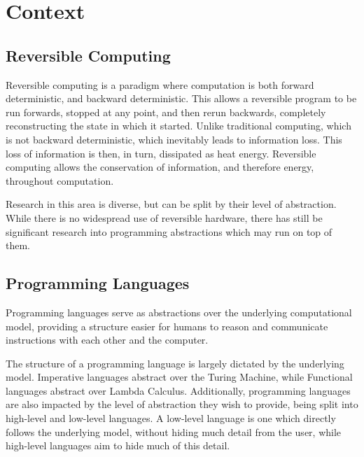 \chapter{Context}


\section{Reversible Computing}


Reversible computing is a paradigm where computation is both forward deterministic, and backward deterministic\cite{IntroductionToReversibleComputing}. This allows a reversible program to be run forwards, stopped at any point, and then rerun backwards, completely reconstructing the state in which it started.
Unlike traditional computing, which is not backward deterministic, which inevitably leads to information loss. This loss of information is then, in turn, dissipated as heat energy\cite{landauerIrreversibility}. Reversible computing allows the conservation of information, and therefore energy, throughout computation\cite{Landauer}.

Research in this area is diverse, but can be split by their level of abstraction. While there is no widespread use of reversible hardware, there has still be significant research into programming abstractions which may run on top of them.

\section{Programming Languages}

Programming languages serve as abstractions over the underlying computational model, providing a structure easier for humans to reason and communicate instructions with each other and the computer. 

The structure of a programming language is largely dictated by the underlying model. Imperative languages abstract over the Turing Machine\cite{onComputableNumbers}, while Functional languages abstract over Lambda Calculus\cite{Lambda}. Additionally, programming languages are also impacted by the level of abstraction they wish to provide, being split into high-level and low-level languages. A low-level language is one which directly follows the underlying model, without hiding much detail from the user, while high-level languages aim to hide much of this detail.

